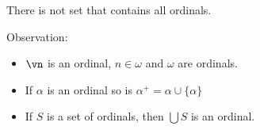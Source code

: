 \begin{theorem}
    There is not set that contains all ordinals. 
\end{theorem}

\noindent
Observation: 
\begin{itemize}
    \item $\vn$ is an ordinal, $n \in \omega$ and $\omega$ are ordinals. 
    \item If $\alpha$ is an ordinal so is $\alpha^+ = \alpha \cup \{ \alpha \}$ 
    \item If $S$ is a set of ordinals, then $\bigcup S$ is an ordinal. 
\end{itemize}